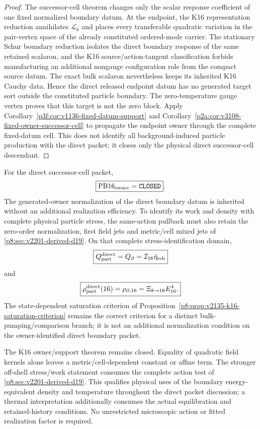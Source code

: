 \documentclass[12pt,a4paper]{article}
\begin{document}
\begin{proof}
The successor-cell theorem changes only the scalar response coefficient of one
fixed normalized boundary datum.  At the endpoint, the K16 representation
reduction annihilates $\mathcal L_6$ and places every transferable quadratic
variation in the pair-vertex space of the already constituted ordered-mode
carrier.  The stationary Schur boundary reduction isolates the direct boundary response
of the same retained scalaron, and the K16 source/action-tangent classification
forbids manufacturing an additional nongauge configuration role from the
compact source datum.  The exact bulk scalaron nevertheless keeps its inherited
K16 Cauchy data.  Hence the direct released endpoint datum has no generated target
sort outside the constituted particle boundary.  The zero-temperature gauge
vertex proves that this target is not the zero block.  Apply
Corollary~\ref{p3f:cor:v1136-fixed-datum-support} and
Corollary~\ref{p2a:cor:v3108-fixed-owner-successor-cell} to propagate the
endpoint owner through the complete fixed-datum cell.  This does not identify
all background-induced particle production with the direct packet; it closes
only the physical direct successor-cell descendant.
\end{proof}

\begin{corollary}
\label{p8:cor:v2136-pb16-closed}
For the direct successor-cell packet,
\[
 \boxed{\mathrm{PB16}_{\rm owner}=\texttt{CLOSED}}.
\]
The generated-owner normalization of the direct boundary datum is
inherited without an additional realization efficiency. To identify its
work and density with complete physical particle stress, the same-action
pullback must also retain the zero-order normalization, first field jets
and metric/cell mixed jets of
\ref{p8:sec:v2201-derived-d19}. On that complete stress-identification
domain,
\[
 \boxed{
 Q_{\rm part}^{\rm direct}=Q_\partial
 =\mathcal I_{16}\dot\eta_{\rm reh}}
\]
and
\[
 \boxed{
 \rho_{\rm part}^{\rm direct}(16)
 =\rho_{\partial,16}
 =\Xi_{8\to16}E_{16}^4.}
\]
The state-dependent saturation criterion of
Proposition~\ref{p8:prop:v2135-k16-saturation-criterion} remains the correct
criterion for a distinct bulk-pumping/comparison branch; it is not an
additional normalization condition on the owner-identified direct boundary
packet.
\end{corollary}


\begin{remark}
\label{p8:rem:v2201-pb16-action-jets}
The K16 owner/support theorem remains closed. Equality of quadratic field
kernels alone leaves a metric/cell-dependent constant or affine term.
The stronger off-shell stress/work statement consumes the complete action
test of \ref{p8:sec:v2201-derived-d19}. This qualifies physical uses of
the boundary energy-equivalent density and temperature throughout the
direct packet discussion; a thermal interpretation additionally consumes
the actual equilibration and retained-history conditions. No unrestricted
microscopic action or fitted realization factor is required.
\end{remark}
\end{document}
